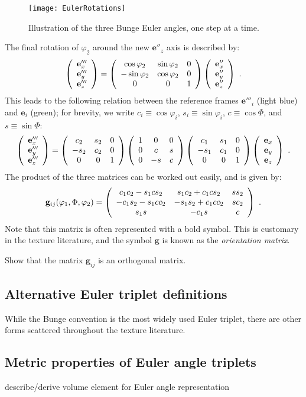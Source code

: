 \begin{figure}[ht]
\centering\leavevmode
\texttt{[image: EulerRotations]}
\label{fig:eulers}
\caption{Illustration of the three Bunge Euler angles, one step at a time.}
\end{figure}

The final rotation of $\varphi_2$ around the new $\mathbf{e}''_{z}$ axis is described by:
\begin{equation}
	\columnthreeb{\mathbf{e}'''_x}{\mathbf{e}'''_y}{\mathbf{e}'''_z} = 
	\matrixtbt{\cos\varphi_2}{\sin\varphi_2}{0}{-\sin\varphi_2}{\cos\varphi_2}{0}{0}{0}{1}
	\columnthreeb{\mathbf{e}''_x}{\mathbf{e}''_y}{\mathbf{e}''_z}\ . 
\end{equation}
This leads to the following relation between the reference frames $\mathbf{e}'''_i$ (light blue) and $\mathbf{e}_i$ (green); for 
brevity, we write $c_i\equiv\cos\varphi_i$, $s_i\equiv\sin\varphi_i$, $c\equiv\cos\Phi$, and $s\equiv\sin\Phi$:
{\small 
\begin{equation}
	\columnthreeb{\mathbf{e}'''_x}{\mathbf{e}'''_y}{\mathbf{e}'''_z} = 
	\matrixtbt{c_2}{s_2}{0}{-s_2}{c_2}{0}{0}{0}{1}
	\matrixtbt{1}{0}{0}{0}{c}{s}{0}{-s}{c}
	\matrixtbt{c_1}{s_1}{0}{-s_1}{c_1}{0}{0}{0}{1}
	\columnthreeb{\mathbf{e}_x}{\mathbf{e}_y}{\mathbf{e}_z}\ . 
\end{equation}}
The product of the three matrices can be worked out easily, and is given by:
{\small\begin{equation}
	\mathbf{g}_{ij}(\varphi_1,\Phi,\varphi_2) = \left(\begin{array}{ccc} c_1c_2-s_1cs_2 & s_1c_2+c_1cs_2 & ss_2 \\ -c_1s_2-s_1cc_2 & -s_1s_2+c_1cc_2 & sc_2 \\ s_1s & -c_1s & c\end{array}\right)\ .\label{eq:eulermatrix}
\end{equation}}
Note that this matrix is often represented with a bold symbol.  This is customary in the texture literature, and the symbol
$\mathbf{g}$ is known as the \textit{orientation matrix}. 

\begin{exercise}
Show that the matrix $\mathbf{g}_{ij}$ is an orthogonal matrix.
\end{exercise}


\subsection{Alternative Euler triplet definitions\label{sec:Eulteralternatives}}
While the Bunge convention is the most widely used Euler triplet, there are other forms scattered throughout the texture literature. 

\subsection{Metric properties of Euler angle triplets\label{sec:eulermetric}}
{\color{blue}describe/derive volume element for Euler angle representation}

